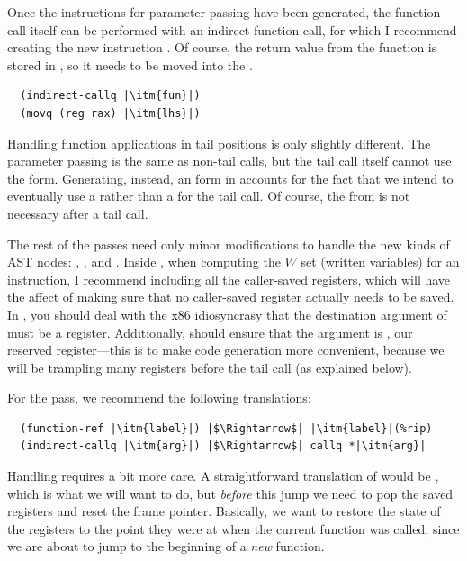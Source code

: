 \documentclass[11pt]{book}
\begin{document}
Once the instructions for parameter passing have been generated, the
function call itself can be performed with an indirect function call,
for which I recommend creating the new instruction
. Of course, the return value from the function
is stored in , so it needs to be moved into the .
\begin{lstlisting}
  (indirect-callq |\itm{fun}|)
  (movq (reg rax) |\itm{lhs}|)
\end{lstlisting}

Handling function applications in tail positions is only slightly
different. The parameter passing is the same as non-tail calls,
but the tail call itself cannot use the  form.
Generating, instead, an  form in 
accounts for the fact that we intend to eventually use a 
rather than a  for the tail call. Of course, the
 from  is not necessary after a tail call.


The rest of the passes need only minor modifications to handle the new
kinds of AST nodes: , , and
. Inside , when computing the $W$ set
(written variables) for an  instruction, I
recommend including all the caller-saved registers, which will have
the affect of making sure that no caller-saved register actually needs
to be saved. In , you should deal with the
x86 idiosyncrasy that the destination argument of  must be
a register. Additionally,  should ensure that
the  argument is , our reserved
register---this is to make code generation more convenient, because
we will be trampling many registers before the tail call (as explained
below).

For the  pass, we recommend the following translations:
\begin{lstlisting}
  (function-ref |\itm{label}|) |$\Rightarrow$| |\itm{label}|(%rip)
  (indirect-callq |\itm{arg}|) |$\Rightarrow$| callq *|\itm{arg}|
\end{lstlisting}
Handling  requires a bit more care. A
straightforward translation of  would be , which is what we will want to do, but \emph{before}
this jump we need to pop the saved registers and reset the frame
pointer. Basically, we want to restore the state of the registers to
the point they were at when the current function was called, since we
are about to jump to the beginning of a \emph{new} function.
\end{document}
